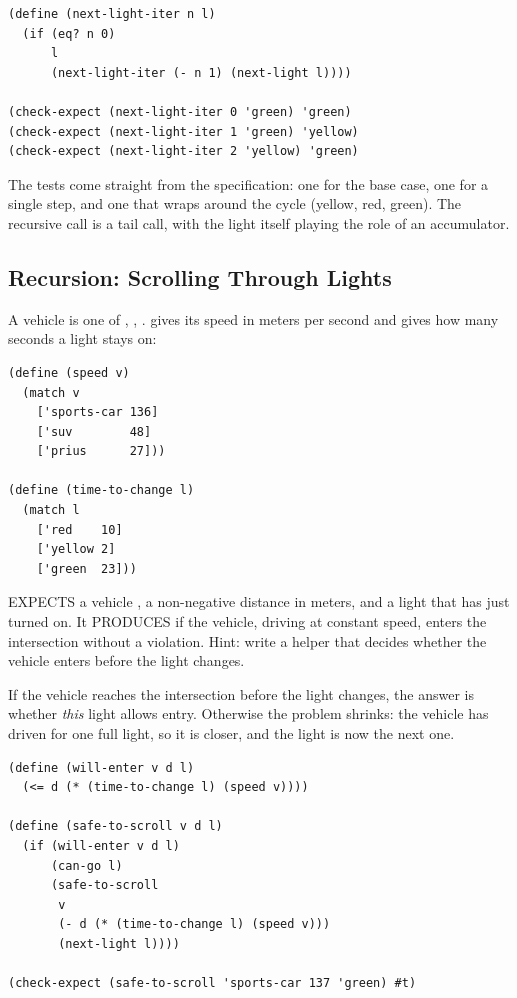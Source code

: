 \begin{lstlisting}
(define (next-light-iter n l)
  (if (eq? n 0)
      l
      (next-light-iter (- n 1) (next-light l))))

(check-expect (next-light-iter 0 'green) 'green)
(check-expect (next-light-iter 1 'green) 'yellow)
(check-expect (next-light-iter 2 'yellow) 'green)
\end{lstlisting}
The tests come straight from the specification: one for the base case, one for a single step, and one that wraps around the cycle (yellow, red, green). The recursive call is a tail call, with the light itself playing the role of an accumulator.

\subsection{Recursion: Scrolling Through Lights}

A vehicle is one of , , .  gives its speed in meters per second and  gives how many seconds a light stays on:
\begin{lstlisting}
(define (speed v)
  (match v
    ['sports-car 136]
    ['suv        48]
    ['prius      27]))

(define (time-to-change l)
  (match l
    ['red    10]
    ['yellow 2]
    ['green  23]))
\end{lstlisting}

\begin{exercise}[Scroll]
 EXPECTS a vehicle , a non-negative distance  in meters, and a light  that has just turned on. It PRODUCES  if the vehicle, driving at constant speed, enters the intersection without a violation. Hint: write a helper that decides whether the vehicle enters before the light changes.
\end{exercise}
\begin{solution}
If the vehicle reaches the intersection before the light changes, the answer is whether \emph{this} light allows entry. Otherwise the problem shrinks: the vehicle has driven for one full light, so it is closer, and the light is now the next one.
\begin{lstlisting}
(define (will-enter v d l)
  (<= d (* (time-to-change l) (speed v))))

(define (safe-to-scroll v d l)
  (if (will-enter v d l)
      (can-go l)
      (safe-to-scroll
       v
       (- d (* (time-to-change l) (speed v)))
       (next-light l))))

(check-expect (safe-to-scroll 'sports-car 137 'green) #t)
\end{lstlisting}
\end{solution}

